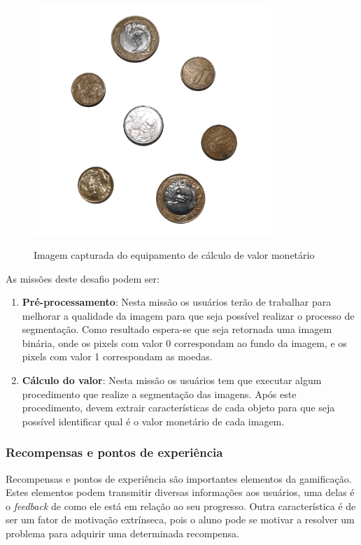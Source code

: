 \documentclass[
	12pt,				%
	oneside,			%
	a4paper,			%
	english,			%
	french,				%
	spanish,			%
	brazil,				%
	]{abntex2}
\begin{document}
\begin{figure}[ht]
\centering
\caption{Imagem capturada do equipamento de cálculo de valor monetário}
\includegraphics[width=0.8\textwidth]{imagens/moedas.jpg}
\sourceAuthor
\label{fig:exemploNarrativa}
\end{figure}

As missões deste desafio podem ser:

\begin{enumerate}
\item \textbf{Pré-processamento}: Nesta missão os usuários terão de trabalhar para melhorar a qualidade da imagem para que seja possível realizar o processo de segmentação. Como resultado espera-se que seja retornada uma imagem binária, onde os pixels com valor 0 correspondam ao fundo da imagem, e os pixels com valor 1 correspondam as moedas.
\item \textbf{Cálculo do valor}: Nesta missão os usuários tem que executar algum procedimento que realize a segmentação das imagens. Após este procedimento, devem extrair características de cada objeto para que seja possível identificar qual é o valor monetário de cada imagem.
\end{enumerate}

\subsubsection{Recompensas e pontos de experiência}

Recompensas e pontos de experiência são importantes elementos da gamificação. Estes elementos podem transmitir diversas informações aos usuários, uma delas é o \textit{feedback} de como ele está em relação ao seu progresso. Outra característica é de ser um fator de motivação extrínseca, pois o aluno pode se motivar a resolver um problema para adquirir uma determinada recompensa.
\end{document}
